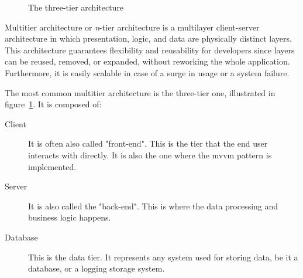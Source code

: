 \begin{toexclude}
\begin{figure}[H]

    \caption{The three-tier architecture}
    \label{fig:threetier-arch}
  \end{figure}

  Multitier architecture or \emph{n}-tier architecture is a multilayer client-server architecture in which presentation, logic, and data are physically distinct layers. This architecture guarantees flexibility and reusability for developers since layers can be reused, removed, or expanded, without reworking the whole application.
  Furthermore, it is easily scalable in case of a surge in usage or a system failure.

  The most common multitier architecture is the three-tier one, illustrated in figure~\ref{fig:threetier-arch}. It is composed of:
  \begin{description}
    \item[Client] It is often also called "front-end".
          This is the tier that the end user interacts with directly.
          It is also the one where the \acrshort{mvvm} pattern is implemented.
    \item[Server] It is also called the "back-end".
          This is where the data processing and business logic happens.
    \item[Database] This is the data tier.
          It represents any system used for storing data, be it a database, or a logging storage system.
  \end{description}


\end{toexclude}
